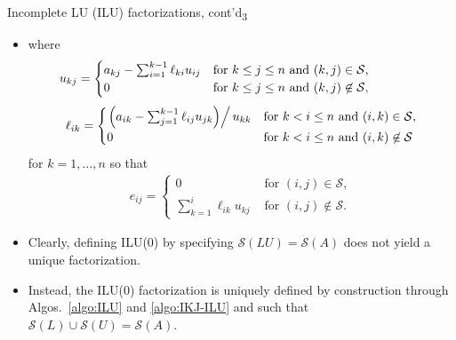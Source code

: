 \documentclass[t,usepdftitle=false]{beamer}
\begin{document}
\begin{frame}{Incomplete LU (ILU) factorizations, cont'd\textsubscript{3}}
\begin{itemize}
\item[] where
\begin{align*}
\hspace*{-1.5cm}
u_{kj}=
\begin{cases}
a_{kj}-\sum_{i=1}^{k-1}\ell_{ki}u_{ij}
&\text{for }k\leq j\leq n\text{ and }(k,j)\in\mathcal{S},\\
0
&\text{for }k\leq j\leq n\text{ and }(k,j)\not\in\mathcal{S},
\end{cases}
\end{align*}
\begin{align*}
\ell_{ik}=
\begin{cases}
\left.\left(a_{ik}-\sum_{j=1}^{k-1}\ell_{ij}u_{jk}\right)\right/u_{kk}
&\text{for }k<i\leq n\text{ and }(i,k)\in\mathcal{S},\\
0
&\text{for }k<i\leq n\text{ and }(i,k)\not\in\mathcal{S}
\end{cases}
\end{align*}
for $k=1,\dots,n$ so that
\begin{align*}
e_{ij}=
\begin{cases}
0
&\text{ for }(i,j)\in\mathcal{S},\\
\sum_{k=1}^i\ell_{ik}u_{kj}
&\text{ for }(i,j)\not\in\mathcal{S}.
\end{cases}
\end{align*}
\item Clearly, defining ILU(0) by specifying $\mathcal{S}(LU)=\mathcal{S}(A)$ does not yield a unique factorization.
\item[] Instead, the ILU(0) factorization is uniquely defined by construction through Algos.~\ref{algo:ILU} and \ref{algo:IKJ-ILU} and such that $\mathcal{S}(L)\cup\mathcal{S}(U)=\mathcal{S}(A)$.
\end{itemize}
\end{frame}
\end{document}
